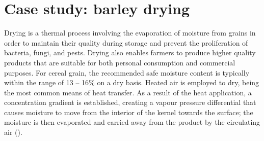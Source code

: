 

\section{Case study: barley drying}


Drying is a thermal process involving the evaporation of moisture from grains in order to maintain 
their quality during storage and prevent the proliferation of bacteria, fungi, and pests. Drying also enables farmers to produce higher quality products that are suitable for both personal consumption and commercial purposes. For cereal grain, the recommended safe moisture content is typically within the range of 13 -- 16\% on a dry basis. Heated air is employed to dry, being the most common means of heat transfer. As a result of the heat application, a concentration gradient is established, creating a vapour pressure differential that causes moisture to move from the interior of the kernel towards the surface; the moisture is then evaporated and carried away from the product by the circulating air (\cite{Bala2017}).

